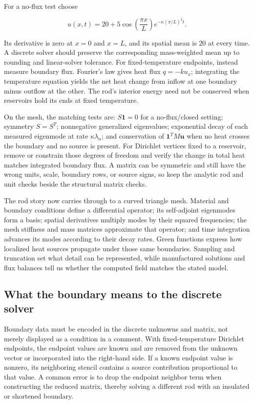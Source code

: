 For a no-flux test choose

\[
u(x,t)=20+5\cos\left(\frac{\pi x}{L}\right)e^{-\kappa(\pi/L)^2t}.
\]

Its derivative is zero at \(x=0\) and \(x=L\), and its spatial mean is \(20\) at every time. A discrete solver should preserve the corresponding mass-weighted mean up to rounding and linear-solver tolerance. For fixed-temperature endpoints, instead measure boundary flux. Fourier's law gives heat flux \(q=-k u_x\); integrating the temperature equation yields the net heat change from inflow at one boundary minus outflow at the other. The rod's interior energy need not be conserved when reservoirs hold its ends at fixed temperature.

On the mesh, the matching tests are: \(S\mathbf1=0\) for a no-flux/closed setting; symmetry \(S=S^T\); nonnegative generalized eigenvalues; exponential decay of each measured eigenmode at rate \(\kappa\lambda_n\); and conservation of \(\mathbf1^TM\mathbf u\) when no heat crosses the boundary and no source is present. For Dirichlet vertices fixed to a reservoir, remove or constrain those degrees of freedom and verify the change in total heat matches integrated boundary flux. A matrix can be symmetric and still have the wrong units, scale, boundary rows, or source signs, so keep the analytic rod and unit checks beside the structural matrix checks.

The rod story now carries through to a curved triangle mesh. Material and boundary conditions define a differential operator; its self-adjoint eigenmodes form a basis; spatial derivatives multiply modes by their squared frequencies; the mesh stiffness and mass matrices approximate that operator; and time integration advances its modes according to their decay rates. Green functions express how localized heat sources propagate under those same boundaries. Sampling and truncation set what detail can be represented, while manufactured solutions and flux balances tell us whether the computed field matches the stated model.

\subsection{What the boundary means to the discrete solver}\label{04-visual-computing-ii-ch030-what-the-boundary-means-to-the-discrete-solver}

Boundary data must be encoded in the discrete unknowns and matrix, not merely displayed as a condition in a comment. With fixed-temperature Dirichlet endpoints, the endpoint values are known and are removed from the unknown vector or incorporated into the right-hand side. If a known endpoint value is nonzero, its neighboring stencil contains a source contribution proportional to that value. A common error is to drop the endpoint neighbor term when constructing the reduced matrix, thereby solving a different rod with an insulated or shortened boundary.


